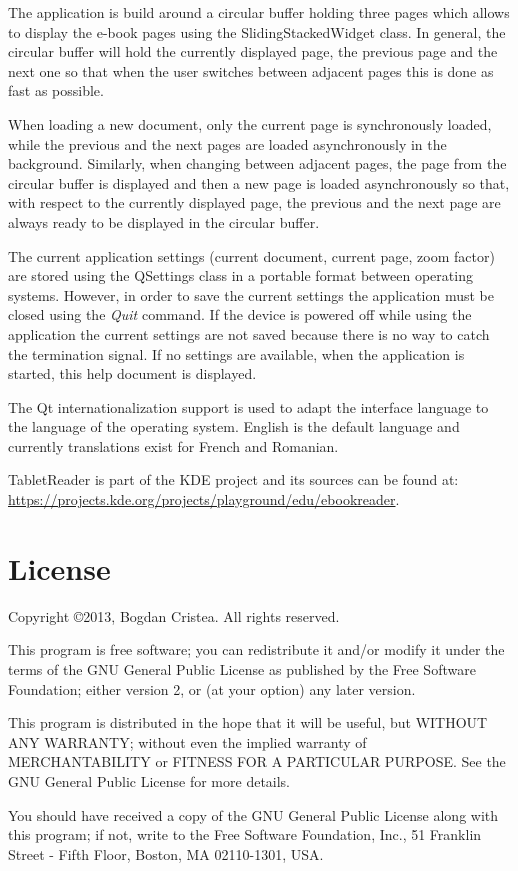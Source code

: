 \documentclass[journal,12pt]{IEEEtran}
\begin{document}
The application is build around a circular buffer holding three pages which allows to display the e-book pages using the \textrm{SlidingStackedWidget} class. In general, the circular buffer will hold the currently displayed page, the previous page and the next one so that when the user switches between adjacent pages this is done as fast as possible. 

When loading a new document, only the current page is synchronously loaded, while the previous and the next pages are loaded asynchronously in the background. Similarly, when changing between adjacent pages, the page from the circular buffer is displayed and then a new page is loaded asynchronously so that, with respect to the currently displayed page, the previous and the next page are always ready to be displayed in the circular buffer.

The current application settings (current document, current page, zoom factor) are stored using the \textrm{QSettings} class in a portable format between operating systems. However, in order to save the current settings the application must be closed using the \textit{Quit} command. If the device is powered off while using the application the current settings are not saved because there is no way to catch the termination signal. If no settings are available, when the application is started, this help document is displayed.

The Qt internationalization support is used to adapt the interface language to the language of the operating system. English is the default language and currently translations exist for French and Romanian.

TabletReader is part of the KDE project and its sources can be found at: \url{https://projects.kde.org/projects/playground/edu/ebookreader}.

\section{License}
 Copyright \copyright 2013, Bogdan Cristea. All rights reserved.
 
 This program is free software; you can redistribute it and/or modify  it under the terms of the GNU General Public License as published by the Free Software Foundation; either version 2, or (at your option)  any later version.
 
 This program is distributed in the hope that it will be useful,  but WITHOUT ANY WARRANTY; without even the implied warranty of
 MERCHANTABILITY or FITNESS FOR A PARTICULAR PURPOSE.  See the  GNU General Public License for more details.
 
 You should have received a copy of the GNU General Public License along with this program; if not, write to the Free Software
 Foundation, Inc., 51 Franklin Street - Fifth Floor, Boston, MA 02110-1301, USA.
\end{document}
